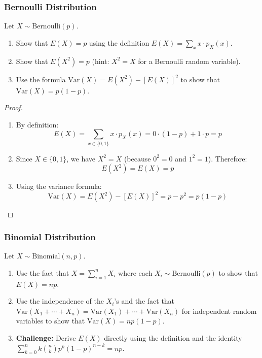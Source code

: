 \subsubsection{Bernoulli Distribution}

\begin{exercise}
Let \(X \sim \text{Bernoulli}(p)\).

\begin{enumerate}[label=(\alph*)]
    \item Show that \(E(X) = p\) using the definition \(E(X) = \sum_{x} x \cdot p_X(x)\).
    \item Show that \(E(X^2) = p\) (hint: \(X^2 = X\) for a Bernoulli random variable).
    \item Use the formula \(\text{Var}(X) = E(X^2) - [E(X)]^2\) to show that \(\text{Var}(X) = p(1-p)\).
\end{enumerate}
\end{exercise}

\begin{proof}
\begin{enumerate}[label=(\alph*)]
    \item By definition:
    \[
    E(X) = \sum_{x \in \{0,1\}} x \cdot p_X(x) = 0 \cdot (1-p) + 1 \cdot p = p
    \]
    
    \item Since \(X \in \{0,1\}\), we have \(X^2 = X\) (because \(0^2 = 0\) and \(1^2 = 1\)). Therefore:
    \[
    E(X^2) = E(X) = p
    \]
    
    \item Using the variance formula:
    \[
    \text{Var}(X) = E(X^2) - [E(X)]^2 = p - p^2 = p(1-p)
    \]
\end{enumerate}
\end{proof}

\subsubsection{Binomial Distribution}

\begin{exercise}
Let \(X \sim \text{Binomial}(n, p)\).

\begin{enumerate}[label=(\alph*)]
    \item Use the fact that \(X = \sum_{i=1}^{n} X_i\) where each \(X_i \sim \text{Bernoulli}(p)\) to show that \(E(X) = np\).
    \item Use the independence of the \(X_i\)'s and the fact that \(\text{Var}(X_1 + \cdots + X_n) = \text{Var}(X_1) + \cdots + \text{Var}(X_n)\) for independent random variables to show that \(\text{Var}(X) = np(1-p)\).
    \item \textbf{Challenge:} Derive \(E(X)\) directly using the definition and the identity \(\sum_{k=0}^{n} k \binom{n}{k} p^k (1-p)^{n-k} = np\).
\end{enumerate}
\end{exercise}

